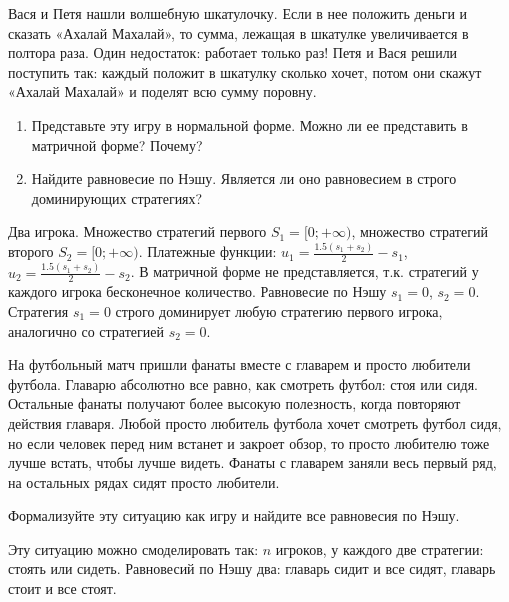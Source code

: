 \begin{problem}
Вася и Петя нашли волшебную шкатулочку. Если в нее положить деньги и сказать «Ахалай Махалай», то сумма, лежащая в шкатулке увеличивается в полтора раза. Один недостаток: работает только раз! Петя и Вася решили поступить так: каждый положит в шкатулку сколько хочет, потом они скажут «Ахалай Махалай» и поделят всю сумму поровну.\par
\begin{enumerate}
\item 	Представьте эту игру в нормальной форме. Можно ли ее представить в матричной форме? Почему?\par
\item 	Найдите равновесие по Нэшу. Является ли оно равновесием в строго доминирующих стратегиях?
\end{enumerate}



\begin{sol}
Два игрока. Множество стратегий первого $S_{1}=[0;+\infty)$, множество стратегий второго $S_{2}=[0;+\infty)$. Платежные функции: $u_{1}=\frac{1.5(s_{1}+s_{2})}{2}-s_{1}$,  $u_{2}=\frac{1.5(s_{1}+s_{2})}{2}-s_{2}$. В матричной форме не представляется, т.к. стратегий у каждого игрока бесконечное количество. Равновесие по Нэшу $s_{1}=0$, $s_{2}=0$. Стратегия $s_{1}=0$ строго доминирует любую стратегию первого игрока, аналогично со стратегией $s_{2}=0$.
\end{sol}
\end{problem}

\begin{problem}
На футбольный матч пришли фанаты вместе с главарем и просто любители футбола. Главарю абсолютно все равно, как смотреть футбол: стоя или сидя. Остальные фанаты получают более высокую полезность, когда повторяют действия главаря. Любой просто любитель футбола хочет смотреть футбол сидя, но если человек перед ним встанет и закроет обзор, то просто любителю тоже лучше встать, чтобы лучше видеть. Фанаты с главарем заняли весь первый ряд, на остальных рядах сидят просто любители.\par

Формализуйте эту ситуацию как игру и найдите все равновесия по Нэшу.

\begin{sol}
Эту ситуацию можно смоделировать так: $n$ игроков, у каждого две стратегии: стоять или сидеть. Равновесий по Нэшу два: главарь сидит и все сидят, главарь стоит и все стоят.
\end{sol}
\end{problem}



